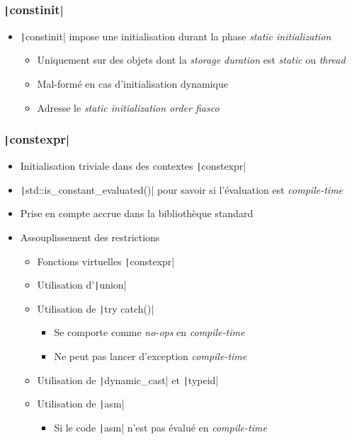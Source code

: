 \documentclass[C++.tex]{subfiles}
\begin{document}
\begin{frame}[fragile]
	\frametitle{\texttt|constinit|}
	\begin{itemize}
		\item \texttt|constinit| impose une initialisation durant la phase \textit{static initialization}
		\begin{itemize}
			\item Uniquement sur des objets dont la \textit{storage duration} est \textit{static} ou \textit{thread}
			\item Mal-formé en cas d'initialisation dynamique
			\item Adresse le \textit{static initialization order fiasco}
		\end{itemize}
	\end{itemize}
\end{frame}

\begin{frame}[fragile]
	\frametitle{\texttt|constexpr|}
	\begin{itemize}
		\item Initialisation triviale dans des contextes \texttt|constexpr|
		\item \texttt|std::is_constant_evaluated()| pour savoir si l'évaluation est \textit{compile-time}
		\item Prise en compte accrue dans la bibliothèque standard
		\item Assouplissement des restrictions
		\begin{itemize}
			\item Fonctions virtuelles \texttt|constexpr|
			\item Utilisation d'\texttt|union|
			\item Utilisation de \texttt|try {} catch()|
			\begin{itemize}
				\item Se comporte comme \textit{no-ops} en \textit{compile-time}
				\item Ne peut pas lancer d'exception \textit{compile-time}
			\end{itemize}
			\item Utilisation de \texttt|dynamic_cast| et \texttt|typeid|
			\item Utilisation de \texttt|asm|
			\begin{itemize}
				\item Si le code \texttt|asm| n'est pas évalué en \textit{compile-time}

			\end{itemize}
		\end{itemize}
	\end{itemize}
\end{frame}
\end{document}
